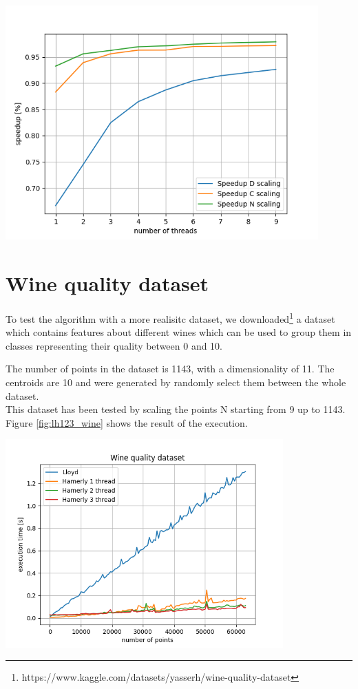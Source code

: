 \documentclass{report}
\begin{document}
\begin{minipage}[b]{0.48\textwidth}

  \begin{center} 
    \includegraphics[width = 0.9\textwidth]{imgs/rndspeedup.png}
    \label{fig:speedup}
  \end{center}

  \section*{Wine quality dataset}
  To test the algorithm with a more realisitc dataset, we downloaded\footnote{https://www.kaggle.com/datasets/yasserh/wine-quality-dataset} a dataset which contains features about different wines which can be used to group them in classes representing their quality between 0 and 10.

  The number of points in the dataset is 1143, with a dimensionality of 11. The centroids are 10 and were generated by randomly select them between the whole dataset.\\

  This dataset has been tested by scaling the points N starting from 9 up to 1143. Figure \ref{fig:lh123_wine} shows the result of the execution.

  \begin{center} 
    \includegraphics[width = 0.8\textwidth]{imgs/lh123_wine.png}
    \label{fig:lh123_wine}
  \end{center}


\end{minipage}
\end{document}
